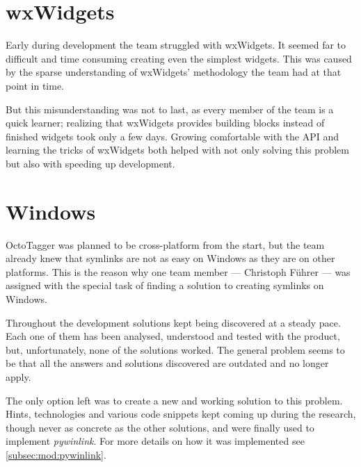 \section{wxWidgets}

Early during development the team struggled with wxWidgets. It seemed far to
difficult and time consuming creating even the simplest widgets. This was
caused by the sparse understanding of wxWidgets' methodology the team had at
that point in time.

But this misunderstanding was not to last, as every member of the team is a
quick learner; realizing that wxWidgets provides building blocks instead of
finished widgets took only a few days. Growing comfortable with the API and
learning the tricks of wxWidgets both helped with not only solving this problem
but also with speeding up development.

\section{Windows}

OctoTagger was planned to be cross-platform from the start, but the team
already knew that symlinks are not as easy on Windows as they are on other
platforms. This is the reason why one team member --- Christoph Führer --- was
assigned with the special task of finding a solution to creating symlinks on
Windows.

Throughout the development solutions kept being discovered at a steady pace.
Each one of them has been analysed, understood and tested with the product,
but, unfortunately, none of the solutions worked. The general problem seems to
be that all the answers and solutions discovered are outdated and no longer
apply.

The only option left was to create a new and working solution to this problem.
Hints, technologies and various code snippets kept coming up during the
research, though never as concrete as the other solutions, and were finally
used to implement \emph{pywinlink}. For more details on how it was implemented
see \cref{subsec:mod:pywinlink}.
